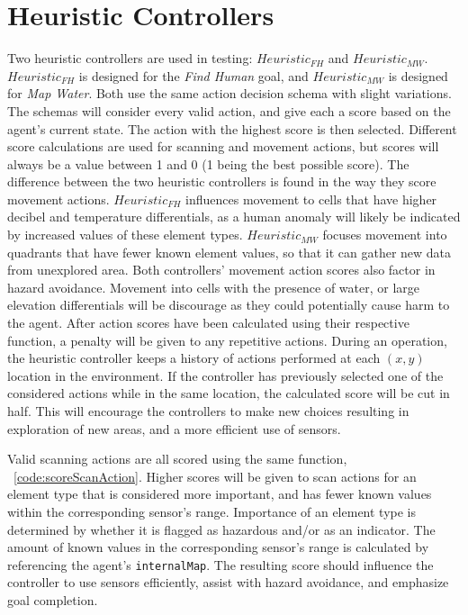 \section{Heuristic Controllers}
Two heuristic controllers are used in testing: $Heuristic_{FH}$ and $Heuristic_{MW}$.
$Heuristic_{FH}$ is designed for the \textit{Find Human} goal, and $Heuristic_{MW}$ is designed for \textit{Map Water}.
Both use the same action decision schema with slight variations.
The schemas will consider every valid action, and give each a score based on the agent's current state.
The action with the highest score is then selected.
Different score calculations are used for scanning and movement actions, but scores will always be a value between 1 and 0 (1 being the best possible score).
The difference between the two heuristic controllers is found in the way they score movement actions.
$Heuristic_{FH}$ influences movement to cells that have higher decibel and temperature differentials, as a human anomaly will likely be indicated by increased values of these element types.
$Heuristic_{MW}$ focuses movement into quadrants that have fewer known element values, so that it can gather new data from unexplored area.
Both controllers' movement action scores also factor in hazard avoidance.
Movement into cells with the presence of water, or large elevation differentials will be discourage as they could potentially cause harm to the agent.
After action scores have been calculated using their respective function, a penalty will be given to any repetitive actions.
During an operation, the heuristic controller keeps a history of actions performed at each $(x,y)$ location in the environment.
If the controller has previously selected one of the considered actions while in the same location, the calculated score will be cut in half.
This will encourage the controllers to make new choices resulting in exploration of new areas, and a more efficient use of sensors.

Valid scanning actions are all scored using the same function, ~\ref{code:scoreScanAction}.
Higher scores will be given to scan actions for an element type that is considered more important, and has fewer known values within the corresponding sensor's range.
Importance of an element type is determined by whether it is flagged as hazardous and/or as an indicator.
The amount of known values in the corresponding sensor's range is calculated by referencing the agent's \texttt{internalMap}.
The resulting score should influence the controller to use sensors efficiently, assist with hazard avoidance, and emphasize goal completion.

